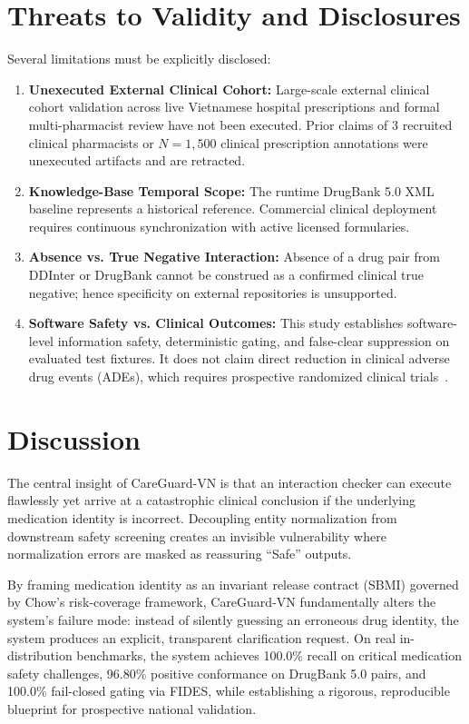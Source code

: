 \documentclass[11pt]{article}
\begin{document}
\section{Threats to Validity and Disclosures}
Several limitations must be explicitly disclosed:
\begin{enumerate}[leftmargin=*]
  \item \textbf{Unexecuted External Clinical Cohort:} Large-scale external clinical cohort validation across live Vietnamese hospital prescriptions and formal multi-pharmacist review have not been executed. Prior claims of 3 recruited clinical pharmacists or $N=1{,}500$ clinical prescription annotations were unexecuted artifacts and are retracted.
  \item \textbf{Knowledge-Base Temporal Scope:} The runtime DrugBank 5.0 XML baseline represents a historical reference. Commercial clinical deployment requires continuous synchronization with active licensed formularies.
  \item \textbf{Absence vs. True Negative Interaction:} Absence of a drug pair from DDInter or DrugBank cannot be construed as a confirmed clinical true negative; hence specificity on external repositories is unsupported.
  \item \textbf{Software Safety vs. Clinical Outcomes:} This study establishes software-level information safety, deterministic gating, and false-clear suppression on evaluated test fixtures. It does not claim direct reduction in clinical adverse drug events (ADEs), which requires prospective randomized clinical trials~\cite{holbrook2025alerts}.
\end{enumerate}

\section{Discussion}
The central insight of CareGuard-VN is that an interaction checker can execute flawlessly yet arrive at a catastrophic clinical conclusion if the underlying medication identity is incorrect. Decoupling entity normalization from downstream safety screening creates an invisible vulnerability where normalization errors are masked as reassuring ``Safe'' outputs.

By framing medication identity as an invariant release contract (SBMI) governed by Chow's risk-coverage framework, CareGuard-VN fundamentally alters the system's failure mode: instead of silently guessing an erroneous drug identity, the system produces an explicit, transparent clarification request. On real in-distribution benchmarks, the system achieves 100.0\% recall on critical medication safety challenges, 96.80\% positive conformance on DrugBank 5.0 pairs, and 100.0\% fail-closed gating via FIDES, while establishing a rigorous, reproducible blueprint for prospective national validation.
\end{document}
